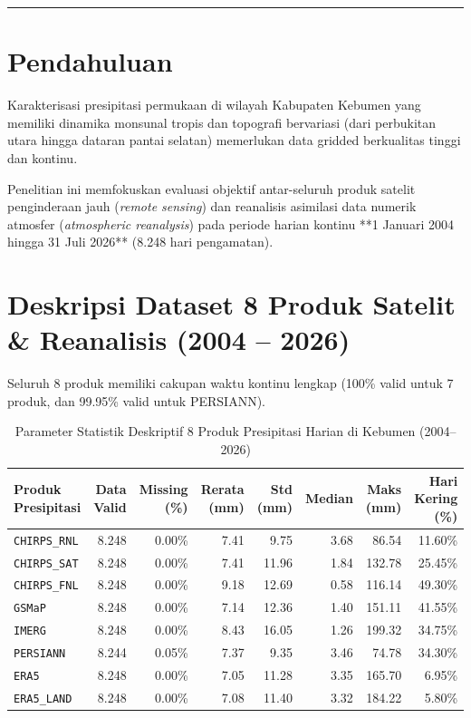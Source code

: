 \documentclass[11pt,a4paper]{article}
\begin{document}
\vspace{0.6cm}
\hrule
\vspace{0.6cm}

\section{Pendahuluan}
Karakterisasi presipitasi permukaan di wilayah Kabupaten Kebumen yang memiliki dinamika monsunal tropis dan topografi bervariasi (dari perbukitan utara hingga dataran pantai selatan) memerlukan data gridded berkualitas tinggi dan kontinu. 

Penelitian ini memfokuskan evaluasi objektif antar-seluruh produk satelit penginderaan jauh (\textit{remote sensing}) dan reanalisis asimilasi data numerik atmosfer (\textit{atmospheric reanalysis}) pada periode harian kontinu **1 Januari 2004 hingga 31 Juli 2026** (8.248 hari pengamatan).

\section{Deskripsi Dataset 8 Produk Satelit \& Reanalisis (2004 -- 2026)}
Seluruh 8 produk memiliki cakupan waktu kontinu lengkap (100\% valid untuk 7 produk, dan 99.95\% valid untuk PERSIANN).

\begin{table}[htbp]
\centering
\small
\caption{Parameter Statistik Deskriptif 8 Produk Presipitasi Harian di Kebumen (2004--2026)}
\label{tab:deskriptif}
\begin{tabular*}{\textwidth}{@{\extracolsep{\fill}}lrrrrrrr@{}}
\toprule
\textbf{Produk Presipitasi} & \textbf{Data Valid} & \textbf{Missing (\%)} & \textbf{Rerata (mm)} & \textbf{Std (mm)} & \textbf{Median} & \textbf{Maks (mm)} & \textbf{Hari Kering (\%)} \\
\midrule
\texttt{CHIRPS\_RNL}  & 8.248 & 0.00\% & 7.41 & 9.75  & 3.68 & 86.54  & 11.60\% \\
\texttt{CHIRPS\_SAT}  & 8.248 & 0.00\% & 7.41 & 11.96 & 1.84 & 132.78 & 25.45\% \\
\texttt{CHIRPS\_FNL}  & 8.248 & 0.00\% & 9.18 & 12.69 & 0.58 & 116.14 & 49.30\% \\
\texttt{GSMaP}        & 8.248 & 0.00\% & 7.14 & 12.36 & 1.40 & 151.11 & 41.55\% \\
\texttt{IMERG}        & 8.248 & 0.00\% & 8.43 & 16.05 & 1.26 & 199.32 & 34.75\% \\
\texttt{PERSIANN}     & 8.244 & 0.05\% & 7.37 & 9.35  & 3.46 & 74.78  & 34.30\% \\
\texttt{ERA5}         & 8.248 & 0.00\% & 7.05 & 11.28 & 3.35 & 165.70 & 6.95\% \\
\texttt{ERA5\_LAND}   & 8.248 & 0.00\% & 7.08 & 11.40 & 3.32 & 184.22 & 5.80\% \\
\bottomrule
\end{tabular*}
\end{table}
\end{document}
